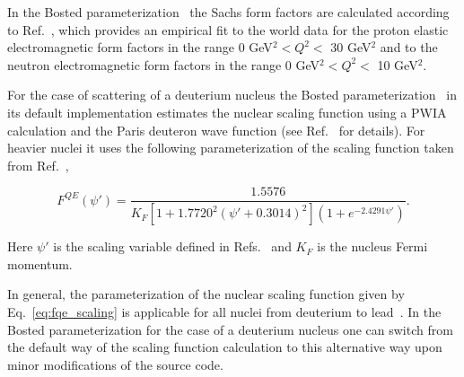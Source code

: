 In the Bosted parameterization~\cite{Bosted_fit,Bosted:2007xd} the Sachs form factors are calculated according to Ref.~\cite{Bosted:1994tm}, which provides an empirical fit to the world data for the proton elastic electromagnetic form factors in the range 0 GeV$^{2}$$< Q^{2} <$ 30 GeV$^{2}$ and to the neutron electromagnetic form factors in the range 0 GeV$^{2}$$< Q^{2} <$ 10 GeV$^{2}$. 


For the case of scattering of a deuterium nucleus the Bosted parameterization~\cite{Bosted_fit,Bosted:2007xd} in its default implementation estimates the nuclear scaling function using a PWIA calculation and the Paris deuteron wave function (see Ref.~\cite{Bosted:2007xd} for details). For heavier nuclei it uses the following parameterization of the scaling function taken from Ref.~\cite{Bodek:2014pka},%

\begin{equation}
F^{QE}(\psi') = \frac{1.5576}{K_{F}[1 + 1.7720^{2}(\psi' + 0.3014)^{2}](1 + e^{-2.4291\psi'})}.\label{eq:fqe_scaling}
\end{equation}

Here $\psi'$ is the scaling variable defined in Refs.~\cite{Bodek:2014pka,Amaro:2004bs} and $K_{F}$ is the nucleus Fermi momentum.


In general, the parameterization of the nuclear scaling function given by Eq.~\eqref{eq:fqe_scaling} is applicable for all nuclei from deuterium to lead~\cite{Bodek:2014pka}. In the Bosted parameterization for the case of a deuterium nucleus one can switch from the default way of the scaling function calculation to this alternative way upon minor modifications of the source code.


